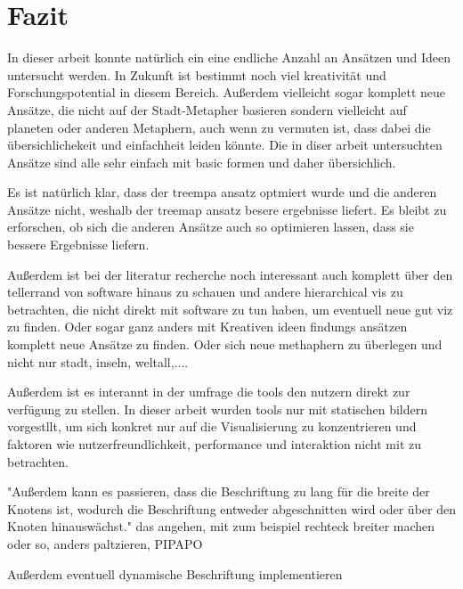 \section{Fazit} \label{sec:Fazit}
In dieser arbeit konnte natürlich ein eine endliche Anzahl an Ansätzen und Ideen untersucht werden. In Zukunft ist bestimmt noch viel kreativität und Forschungspotential in diesem Bereich. Außerdem vielleicht sogar komplett neue Ansätze, die nicht auf der Stadt-Metapher basieren sondern vielleicht auf planeten oder anderen Metaphern, auch wenn zu vermuten ist, dass dabei die übersichlichekeit und einfachheit leiden könnte. Die in diser arbeit untersuchten Ansätze sind alle sehr einfach mit basic formen und daher übersichlich.


Es ist natürlich klar, dass der treempa ansatz optmiert wurde und die anderen Ansätze nicht, weshalb der treemap ansatz besere ergebnisse liefert. 
Es bleibt zu erforschen, ob sich die anderen Ansätze auch so optimieren lassen, dass sie bessere Ergebnisse liefern.


Außerdem ist bei der literatur recherche noch interessant auch komplett über den tellerrand von software hinaus zu schauen und andere hierarchical vis zu betrachten, die nicht direkt mit software zu tun haben, um eventuell neue gut viz zu finden. Oder sogar ganz anders mit Kreativen ideen findungs ansätzen komplett neue Ansätze zu finden. Oder sich neue methaphern zu überlegen und nicht nur stadt, inseln, weltall,....

Außerdem ist es interannt in der umfrage die tools den nutzern direkt zur verfügung zu stellen. In dieser arbeit wurden tools nur mit statischen bildern vorgestllt, um sich konkret nur auf die Visualisierung zu konzentrieren und faktoren wie nutzerfreundlichkeit, performance und interaktion nicht mit zu betrachten.

"Außerdem kann es passieren, dass die Beschriftung zu lang für die breite der Knotens ist, wodurch die Beschriftung entweder abgeschnitten wird oder über den Knoten hinauswächst." das angehen, mit zum beispiel rechteck breiter machen oder so, anders paltzieren, PIPAPO

Außerdem eventuell dynamische Beschriftung implementieren